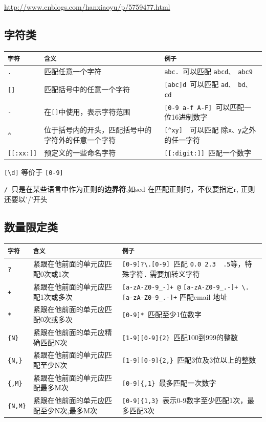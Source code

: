 \documentclass[UTF8,a4paper,12pt]{ctexbook}
\begin{document}
		\url{http://www.cnblogs.com/hanxiaoyu/p/5759477.html}

		\subsection{字符类}
			\begin{table}[H]
				\centering
				\begin{tabular}{l|m{7cm}|m{8cm}}
					\hline
					\verb|字符 |   	   & \verb|含义| & \verb|例子|\\
					\hline
					\verb|. |   	   & 匹配任意一个字符 & \verb|abc. |可以匹配 \verb|abcd、 abc9| 		\\
					\verb|[]|   	   & 匹配括号中的任意一个字符 & \verb|[abc]d |可以匹配 \verb|ad、 bd、cd|		\\
					\verb|- |   	   & 在\verb|[]|中使用，表示字符范围 &\verb|[0-9 a-f A-F] |可以匹配一位16进制数字	\\
					\verb|^ |   	   & 位于括号内的开头，匹配括号中的字符外的任意一个字符 &\verb|[^xy]  |可以匹配 除\verb|x、y|之外的任一字符		\\
					\verb|[[:xx:]]|	   & 预定义的一些命名字符 & \verb|[[:digit:]] |匹配一个数字    \\
					\hline
				\end{tabular}
			\end{table}	
		
			\verb|[\d]| 等价于 \verb|[0-9]|
			
			\verb|/ |只是在某些语言中作为正则的\textbf{边界符},如sed 在匹配正则时，不仅要指定r, 正则还要以'/'开头
		\subsection{数量限定类}
			\begin{table}[H]
				\centering
				\begin{tabular}{l|m{8cm}|m{7cm}}
					\hline
					\verb|字符 |   	   & \verb|含义| & \verb|例子|\\
					\hline
					\verb|? |   	   & 紧跟在他前面的单元应匹配0次或1次 & \verb|[0-9]?\.[0-9] |匹配 \verb|0.0 2.3  .5|等，特殊字符\verb|.| 需要加转义字符 		\\
					\verb|+ |   	   & 紧跟在他前面的单元应匹配1次或多次 & \verb|[a-zA-Z0-9_-]+ @| \verb|[a-zA-Z0-9_.-]+ \.|\verb|[a-zA-Z0-9_.-]+| 匹配email 地址 \\
					\verb|* |   	   & 紧跟在他前面的单元应匹配0次或多次 & \verb|[0-9]* |匹配至少1位数字	 \\
					\verb|{N}|   	   & 紧跟在他前面的单元应精确匹配N次 & \verb|[1-9][0-9]{2} |匹配100到999的整数	\\
					\verb|{N,}|	  	   & 紧跟在他前面的单元应匹配至少N次 & \verb|[1-9][0-9]{2,} |匹配3位及3位以上的整数   \\
					\verb|{,M}|   	   & 紧跟在他前面的单元应匹配最多M次 & \verb|[0-9]{,1} |最多匹配一次数字	\\
					\verb|{N,M}|	   & 紧跟在他前面的单元应匹配至少N次,最多M次 &  \verb|[0-9]{1,3} |表示0-9数字至少匹配1次，最多匹配3次 \\
					\hline
				\end{tabular}
			\end{table}	
			
\end{document}
